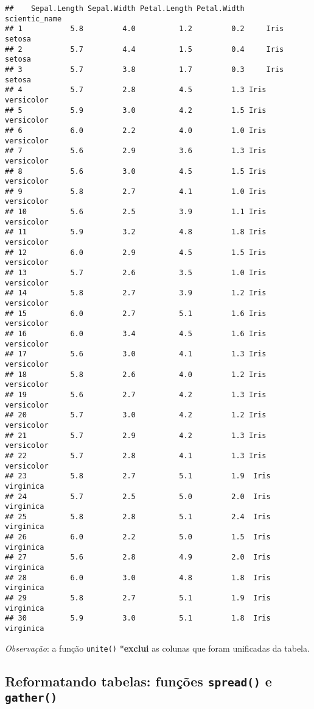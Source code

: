 \documentclass[
]{book}
\begin{document}
\begin{verbatim}
##    Sepal.Length Sepal.Width Petal.Length Petal.Width   scientic_name
## 1           5.8         4.0          1.2         0.2     Iris setosa
## 2           5.7         4.4          1.5         0.4     Iris setosa
## 3           5.7         3.8          1.7         0.3     Iris setosa
## 4           5.7         2.8          4.5         1.3 Iris versicolor
## 5           5.9         3.0          4.2         1.5 Iris versicolor
## 6           6.0         2.2          4.0         1.0 Iris versicolor
## 7           5.6         2.9          3.6         1.3 Iris versicolor
## 8           5.6         3.0          4.5         1.5 Iris versicolor
## 9           5.8         2.7          4.1         1.0 Iris versicolor
## 10          5.6         2.5          3.9         1.1 Iris versicolor
## 11          5.9         3.2          4.8         1.8 Iris versicolor
## 12          6.0         2.9          4.5         1.5 Iris versicolor
## 13          5.7         2.6          3.5         1.0 Iris versicolor
## 14          5.8         2.7          3.9         1.2 Iris versicolor
## 15          6.0         2.7          5.1         1.6 Iris versicolor
## 16          6.0         3.4          4.5         1.6 Iris versicolor
## 17          5.6         3.0          4.1         1.3 Iris versicolor
## 18          5.8         2.6          4.0         1.2 Iris versicolor
## 19          5.6         2.7          4.2         1.3 Iris versicolor
## 20          5.7         3.0          4.2         1.2 Iris versicolor
## 21          5.7         2.9          4.2         1.3 Iris versicolor
## 22          5.7         2.8          4.1         1.3 Iris versicolor
## 23          5.8         2.7          5.1         1.9  Iris virginica
## 24          5.7         2.5          5.0         2.0  Iris virginica
## 25          5.8         2.8          5.1         2.4  Iris virginica
## 26          6.0         2.2          5.0         1.5  Iris virginica
## 27          5.6         2.8          4.9         2.0  Iris virginica
## 28          6.0         3.0          4.8         1.8  Iris virginica
## 29          5.8         2.7          5.1         1.9  Iris virginica
## 30          5.9         3.0          5.1         1.8  Iris virginica
\end{verbatim}

\emph{Observação}: a função \texttt{unite()} *\textbf{exclui} as colunas que foram unificadas da tabela.

\hypertarget{reformatando-tabelas-funuxe7uxf5es-spread-e-gather}{%
\subsection{\texorpdfstring{Reformatando tabelas: funções \texttt{spread()} e \texttt{gather()}}{Reformatando tabelas: funções spread() e gather()}}\label{reformatando-tabelas-funuxe7uxf5es-spread-e-gather}}
\end{document}
